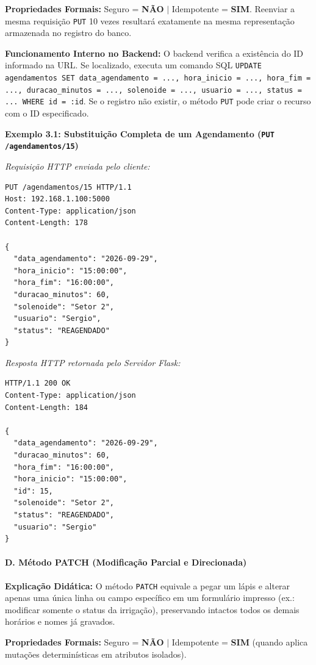 \textbf{Propriedades Formais:} Seguro = \textbf{NÃO} $|$ Idempotente = \textbf{SIM}. Reenviar a mesma requisição \texttt{PUT} 10 vezes resultará exatamente na mesma representação armazenada no registro do banco.

\textbf{Funcionamento Interno no Backend:} O backend verifica a existência do ID informado na URL. Se localizado, executa um comando SQL \texttt{UPDATE agendamentos SET data\_agendamento = ..., hora\_inicio = ..., hora\_fim = ..., duracao\_minutos = ..., solenoide = ..., usuario = ..., status = ... WHERE id = :id}. Se o registro não existir, o método \texttt{PUT} pode criar o recurso com o ID especificado.

\textbf{Exemplo 3.1: Substituição Completa de um Agendamento (\texttt{PUT /agendamentos/15})}

\textit{Requisição HTTP enviada pelo cliente:}
\begin{lstlisting}
PUT /agendamentos/15 HTTP/1.1
Host: 192.168.1.100:5000
Content-Type: application/json
Content-Length: 178

{
  "data_agendamento": "2026-09-29",
  "hora_inicio": "15:00:00",
  "hora_fim": "16:00:00",
  "duracao_minutos": 60,
  "solenoide": "Setor 2",
  "usuario": "Sergio",
  "status": "REAGENDADO"
}
\end{lstlisting}

\textit{Resposta HTTP retornada pelo Servidor Flask:}
\begin{lstlisting}
HTTP/1.1 200 OK
Content-Type: application/json
Content-Length: 184

{
  "data_agendamento": "2026-09-29",
  "duracao_minutos": 60,
  "hora_fim": "16:00:00",
  "hora_inicio": "15:00:00",
  "id": 15,
  "solenoide": "Setor 2",
  "status": "REAGENDADO",
  "usuario": "Sergio"
}
\end{lstlisting}

\paragraph*{D. Método PATCH (Modificação Parcial e Direcionada)}

\textbf{Explicação Didática:} O método \texttt{PATCH} equivale a pegar um lápis e alterar apenas uma única linha ou campo específico em um formulário impresso (ex.: modificar somente o status da irrigação), preservando intactos todos os demais horários e nomes já gravados.

\textbf{Propriedades Formais:} Seguro = \textbf{NÃO} $|$ Idempotente = \textbf{SIM} (quando aplica mutações determinísticas em atributos isolados).

